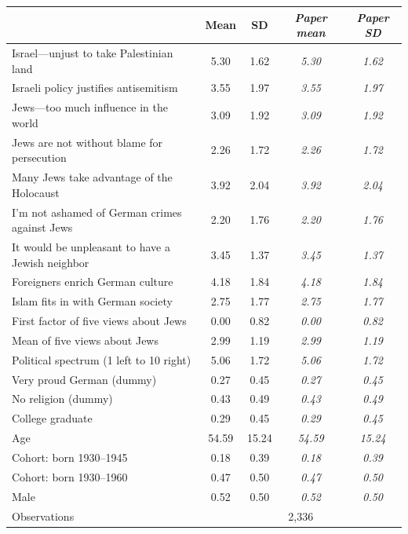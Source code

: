 \begin{tabular}{lcccc}
\toprule
 & Mean & SD & \textit{Paper mean} & \textit{Paper SD} \\
\midrule
Israel---unjust to take Palestinian land & 5.30 & 1.62 & \textit{5.30} & \textit{1.62} \\
Israeli policy justifies antisemitism & 3.55 & 1.97 & \textit{3.55} & \textit{1.97} \\
Jews---too much influence in the world & 3.09 & 1.92 & \textit{3.09} & \textit{1.92} \\
Jews are not without blame for persecution & 2.26 & 1.72 & \textit{2.26} & \textit{1.72} \\
Many Jews take advantage of the Holocaust & 3.92 & 2.04 & \textit{3.92} & \textit{2.04} \\
I'm not ashamed of German crimes against Jews & 2.20 & 1.76 & \textit{2.20} & \textit{1.76} \\
It would be unpleasant to have a Jewish neighbor & 3.45 & 1.37 & \textit{3.45} & \textit{1.37} \\
Foreigners enrich German culture & 4.18 & 1.84 & \textit{4.18} & \textit{1.84} \\
Islam fits in with German society & 2.75 & 1.77 & \textit{2.75} & \textit{1.77} \\
First factor of five views about Jews & 0.00 & 0.82 & \textit{0.00} & \textit{0.82} \\
Mean of five views about Jews & 2.99 & 1.19 & \textit{2.99} & \textit{1.19} \\
Political spectrum (1 left to 10 right) & 5.06 & 1.72 & \textit{5.06} & \textit{1.72} \\
Very proud German (dummy) & 0.27 & 0.45 & \textit{0.27} & \textit{0.45} \\
No religion (dummy) & 0.43 & 0.49 & \textit{0.43} & \textit{0.49} \\
College graduate & 0.29 & 0.45 & \textit{0.29} & \textit{0.45} \\
Age & 54.59 & 15.24 & \textit{54.59} & \textit{15.24} \\
Cohort: born 1930--1945 & 0.18 & 0.39 & \textit{0.18} & \textit{0.39} \\
Cohort: born 1930--1960 & 0.47 & 0.50 & \textit{0.47} & \textit{0.50} \\
Male & 0.52 & 0.50 & \textit{0.52} & \textit{0.50} \\
\midrule
Observations & \multicolumn{4}{c}{2,336} \\
\bottomrule
\end{tabular}
